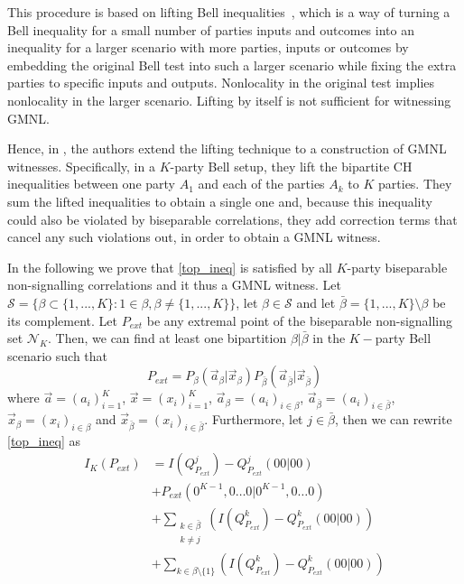 \documentclass[pra,aps,reprint,superscriptaddress]{revtex4-2}
\theoremstyle{theorem}
\begin{document}
This procedure is based on lifting Bell inequalities~\cite{pironio_lifting}, which is a way of turning a Bell inequality for a small number of parties inputs and outcomes into an inequality for a larger scenario with more parties, inputs or outcomes by embedding the original Bell test into such a larger scenario while fixing the extra parties to specific inputs and outputs. Nonlocality in the original test  implies nonlocality in the larger scenario. Lifting by itself is not sufficient for witnessing GMNL. 

Hence, in 
 \cite{Curchod_2019}, the authors extend the lifting technique to a construction of GMNL witnesses.
 Specifically, in a $K$-party Bell setup, they lift the bipartite CH inequalities between one party $A_1$ and each of the parties $A_k$ to $K$ parties. They sum the lifted inequalities to obtain a single one and, because this inequality could also be violated by biseparable correlations, they add correction terms that cancel any such violations out, in order to obtain a GMNL witness.

In the following we prove that \eqref{top_ineq} is  satisfied by all $K$-party biseparable non-signalling correlations and it thus a GMNL witness. 
Let $\mathcal{S} = \{\beta \subset \{1,...,K\}: 1\in\beta,\beta\neq \{1,...,K\}\}$, let $\beta\in\mathcal{S}$ and let $\bar \beta = \{1,...,K\}\setminus\beta$ be its complement. Let $P_{ext}$ be any extremal point of the biseparable non-signalling set $\mathcal{N}_{K}$. Then, we can find at least one bipartition $\beta|\bar \beta$ in the $K-$party Bell scenario such that
\begin{equation}
    P_{ext} = P_{\beta}(\vec a_{\beta}|\vec x_{\beta})P_{\bar \beta}(\vec a_{\bar \beta}| \vec x_{\bar \beta})
\end{equation}
where $\vec a =(a_i)_{i=1}^{K}$, $\vec x =(x_i)_{i=1}^{K}$, $\vec a_{\beta} = (a_i)_{i\in \beta}$, $\vec a_{\bar \beta} = (a_i)_{i\in \bar \beta}$, $\vec x_{\beta} = (x_i)_{i\in \beta}$ and $\vec x_{\bar \beta} = (x_i)_{i\in \bar \beta}$. Furthermore, let $j\in\bar \beta$, 
then we can rewrite \eqref{top_ineq} as
\begin{align}
    \nonumber I_K  \left( P_{ext} \right) &= I\left(Q^j_{P_{ext}}\right)  -  Q^j_{P_{ext}}(00|00) \nonumber \\
    &+  P_{ext}(0^{{ K-1}},0\ldots0|0^{{ K-1}},0\ldots 0) \nonumber\\&
    \nonumber+\sum_{\substack{k\in\bar \beta\\ k\neq j}} \left(I\left(Q^k_{P_{ext}}\right)-Q^k_{P_{ext}}(00|00)\right)  \\&
    + \!\!\!\! \sum_{k\in\beta\setminus \{1\}} \!\! \!\!\!\left(I\left(Q^k_{P_{ext}}\right)-Q^k_{P_{ext}}(00|00)\right) \label{main_ap_a}
\end{align}
\end{document}
